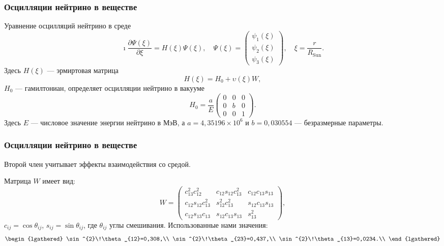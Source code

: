 \documentclass[utf8,9pt,mathserif,usepdftitle=false]{beamer}
\begin{document}
\begin{frame}

  \frametitle{Осцилляции нейтрино в веществе}%
  Уравнение осцилляций нейтрино в среде
  \begin{equation}\label{eq:1}
  	\imath \frac{\partial \Psi(\xi)}{\partial \xi}=H(\xi)\Psi(\xi),
    \quad \Psi(\xi)=
    \begin{pmatrix}
      \psi_1(\xi) \\
      \psi_2(\xi) \\
      \psi_3(\xi)
    \end{pmatrix},
    \quad \xi=\frac{r}{R_{\text{Sun}}}.
  \end{equation}
  Здесь \({H(\xi)}\) — эрмиртовая матрица
  \begin{equation*}
  	H(\xi)=H_0+\upsilon(\xi)W,
  \end{equation*}
  \(H_{0}\) --- гамилтониан, определяет осцилляции нейтрино в
 вакууме
	\begin{equation*}
		H_{0}=\frac{a}{E}
		\begin{pmatrix}
			0 & 0 & 0\\
			0 & b & 0\\
			0 & 0 & 1
		\end{pmatrix}.
	\end{equation*}
	Здесь \(E\) --- числовое значение энергии нейтрино в МэВ, а
	\(a=4,35196\times10^6\) и \(b=0,030554\) --- безразмерные параметры.

\end{frame}


\begin{frame}

  \frametitle{Осцилляции нейтрино в веществе}%


  Второй член учитывает эффекты взаимодействия со средой.

  Матрица \(W\)
  имеет вид:
  \begin{equation*}
  	W=
  	\begin{pmatrix}
  		c_{13}^{2}c_{12}^{2} & c_{12}s_{12}c_{13}^{2} & c_{12}c_{13}s_{13}\\
  		c_{12}s_{12}c_{13}^{2} & s_{12}^{2}c_{13}^{2} & s_{12}c_{13}s_{13}\\
  		c_{12}s_{13}c_{13} & s_{12}c_{13}s_{13} & s_{13}^{2}
  	\end{pmatrix},
  \end{equation*}
  \(c_{ij}=\cos\theta_{ij}\), \(s_{ij}=\sin\theta_{ij}\), где \(\theta_{ij}\)
  углы смешивания. Использованные нами значения:
  \begin{equation*}
    \begin{lgathered}
      \sin^{2}\!\theta_{12}=0,308,\\
      \sin^{2}\!\theta_{23}=0,437,\\
      \sin^{2}\!\theta_{13}=0,0234.\\
    \end{lgathered}
  \end{equation*}

\end{frame}
\end{document}
